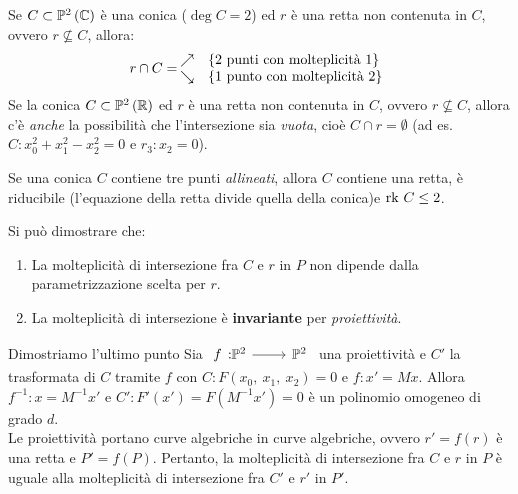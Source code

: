 \begin{example}
	Se $C\subset\proj[2]{\complexset}$ è una conica ($\deg C=2$) ed $r$ è una retta non contenuta in $C$, ovvero $r\nsubseteq C$, allora:
	\begin{equation}
		r\cap C=\hspace{-2mm}\begin{array}{ll}
			\nearrow &\{2\text{ punti con molteplicità } 1\}\\
			\searrow & {\{1 \text{ punto con molteplicità } 2\}}
		\end{array}
	\end{equation}
	Se la conica $C\subset\proj[2]{\realset}$ ed $r$ è una retta non contenuta in $C$, ovvero $r\nsubseteq C$, allora c'è \textit{anche} la possibilità che l'intersezione sia \textit{vuota}, cioè $C\cap r=\emptyset$ (ad es. $C\colon x_0^2+x_1^2-x_2^2=0$ e $r_3\colon x_2=0$).
\end{example}
	
\begin{tips}
	Se una conica $C$ contiene tre punti \textit{allineati}, allora $C$ contiene una retta, è riducibile (l'equazione della retta divide quella della conica)e $\mathrm{rk}\  C\leq 2$.		
\end{tips}
\begin{observe} 	Si può dimostrare che:
	\begin{enumerate}
		\item La molteplicità di intersezione fra $C$ e $r$ in $P$ non dipende dalla parametrizzazione scelta per $r$.
		\item La molteplicità di intersezione è \textbf{invariante} per \textit{proiettività}.
	\end{enumerate}
\vspace{-3mm}
\end{observe}
\begin{demonstration} Dimostriamo l'ultimo punto
	Sia $\funz f {\proj[2]{\ }} {\proj[2]{\ }}$ una proiettività e $C'$ la trasformata di $C$ tramite $f$ con $C\colon F(x_0,\ x_1,\ x_2)=0$ e $f\colon x'=Mx$. Allora $f^{-1}\colon x=M^{-1}x'$ e $C'\colon F'(x')=F(M^{-1}x')=0$ è un polinomio omogeneo di grado $d$.\\
	Le proiettività portano curve algebriche in curve algebriche, ovvero $r'=f(r)$ è una retta e $P'=f\left(P\right)$. Pertanto, la molteplicità di intersezione fra $C$ e $r$ in $P$ è uguale alla molteplicità di intersezione fra $C'$ e $r'$ in $P'$.
\end{demonstration}
